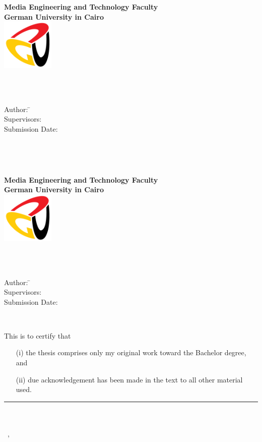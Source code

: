 \newcommand{\titlePage}{

  \thispagestyle{empty}
  \begin{center}
    \textbf{Media Engineering and Technology Faculty}\\[1mm]
    \textbf{German University in Cairo}\\[1mm]
    \includegraphics[width=2.5cm]{images/guc.png}

    \vspace{2cm}
    \doublespacing
    {\Huge \textbf{\titleOfThesisOne}}\\
    \singlespacing
    \vspace{2cm}
    {\large \textbf{\typeOfThesis}}\\

    \vfill
    \parbox{1cm}{
      \begin{large}
        \begin{tabbing}
          Author: \hspace{2cm}
          \=\authorOfThesis\\[2mm]
          Supervisors:
          \>\supervisorOne\\[2mm]
          Submission Date:
          \>\submissionDate\\
        \end{tabbing}
      \end{large}
    }\\
  \end{center}
  \clearpage
}
\titlePage
\thispagestyle{empty}\ \clearpage
\titlePage
\thispagestyle{empty}
This is to certify that
\begin{itemize}
  \item[(i)] the thesis comprises only my original work toward the Bachelor degree, and
  \item[(ii)] due acknowledgement has been made in the text to all other material used.
\end{itemize}

\vspace{2cm}
\begin{flushright}
  \rule[0mm]{6cm}{0.2mm}\\
  \authorOfThesis\\
  \submissionDay~\submissionMonth,~\submissionYear\\
\end{flushright}
\clearpage
